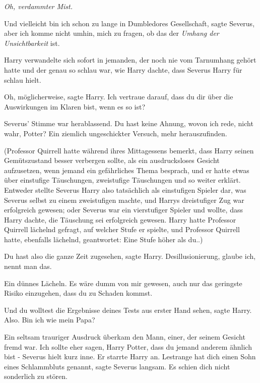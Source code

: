 \emph{Oh, verdammter Mist.}

\glqq{}Und vielleicht bin ich schon zu lange in Dumbledores Gesellschaft\grqq{},
sagte Severus, \glqq{}aber ich komme nicht umhin, mich zu fragen, ob das der
\emph{Umhang der Unsichtbarkeit} ist.\grqq{}

Harry verwandelte sich sofort in jemanden, der noch nie vom Tarnumhang gehört
hatte und der genau so schlau war, wie Harry dachte, dass Severus Harry für
schlau hielt.

\glqq{}Oh, möglicherweise\grqq{}, sagte Harry. \glqq{}Ich vertraue darauf, dass
du dir über die Auswirkungen im Klaren bist, wenn es so ist?\grqq{}

Severus' Stimme war herablassend. \glqq{}Du hast keine Ahnung, wovon ich rede,
nicht wahr, Potter? Ein ziemlich ungeschickter Versuch, mehr
herauszufinden.\grqq{}

(Professor Quirrell hatte während ihres Mittagessens bemerkt, dass Harry seinen
Gemütszustand besser verbergen sollte, als ein ausdrucksloses Gesicht
aufzusetzen, wenn jemand ein gefährliches Thema besprach, und er hatte etwas
über einstufige Täuschungen, zweistufige Täuschungen und so weiter erklärt.
Entweder stellte Severus Harry also tatsächlich als einstufigen Spieler dar, was
Severus selbst zu einem zweistufigen machte, und Harrys dreistufiger Zug war
erfolgreich gewesen; oder Severus war ein vierstufiger Spieler und wollte, dass
Harry dachte, die Täuschung sei erfolgreich gewesen. Harry hatte Professor
Quirrell lächelnd gefragt, auf welcher Stufe er spielte, und Professor Quirrell
hatte, ebenfalls lächelnd, geantwortet: \glqq{}Eine Stufe höher als du.\grqq{}.)

\glqq{}Du hast also die ganze Zeit zugesehen\grqq{}, sagte Harry. \glqq{}
Desillusionierung, glaube ich, nennt man das.\grqq{}

Ein dünnes Lächeln. \glqq{}Es wäre dumm von mir gewesen, auch nur das geringste
Risiko einzugehen, dass du zu Schaden kommst.\grqq{}

\glqq{}Und du wolltest die Ergebnisse deines Tests aus erster Hand sehen\grqq{},
sagte Harry. \glqq{}Also. Bin ich wie mein Papa?\grqq{}

Ein seltsam trauriger Ausdruck überkam den Mann, einer, der seinem Gesicht fremd
war. \glqq{}Ich sollte eher sagen, Harry Potter, dass du jemand anderem ähnlich
bist -\grqq{} Severus hielt kurz inne. Er starrte Harry an. \glqq{}Lestrange hat
dich einen Sohn eines Schlammbluts genannt\grqq{}, sagte Severus langsam.
\glqq{}Es schien dich nicht sonderlich zu stören.\grqq{}

